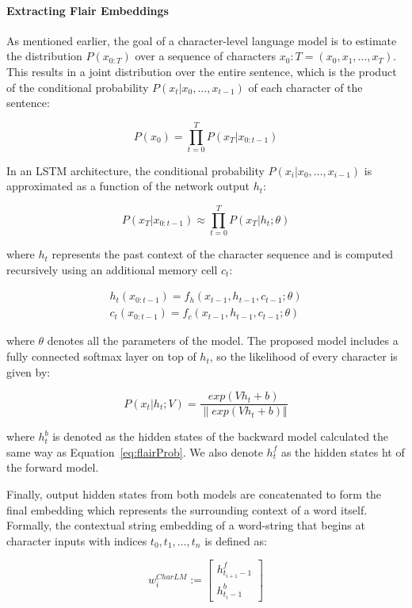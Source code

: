 \paragraph{Extracting Flair Embeddings}
\label{cap3:infExtr/sequenceLabeling/contextualEmbeddings/flairEmbeddings}
As mentioned earlier, the goal of a character-level language model is to estimate the 
distribution $P(x_{0:T})$ over a sequence of characters $x_0:T =(x_0, x_1,\ldots, x_T)$. This 
results in a joint distribution over the entire sentence, which is the product of the 
conditional probability $P(x_t|x_0,..., x_{t-1})$ of each character of the sentence:

\begin{equation} \label{eq:flairProb}
    P(x_0) = \prod_{t=0}^{T} P(x_T|x_{0:t-1})
\end{equation}

In an LSTM architecture, the conditional probability $P(x_i|x_0,\ldots,x_{i-1})$ is approximated 
as a function of the network output $h_t$:

\[
    P(x_T|x_{0:t-1}) \approx \prod_{t=0}^{T} P(x_T|h_t;\theta)    
\]

where $h_t$ represents the past context of the character sequence and is computed recursively 
using an additional memory cell $c_t$:

\begin{align*}
    h_t(x_{0:t-1})=f_h(x_{t-1},h_{t-1},c_{t-1};\theta) \\
    c_t(x_{0:t-1})=f_c(x_{t-1},h_{t-1},c_{t-1};\theta)    
\end{align*}

where $\theta$ denotes all the parameters of the model. The proposed model includes a fully 
connected softmax layer on top of $h_t$, so the likelihood of every character is given by:

\[
    P(x_t|h_t;V) = \frac{exp(V h_t+b)}{\| exp(V h_t+b) \Vert }
\]

where $h_t^b$ is denoted as the hidden states of the backward model calculated the same way as 
Equation~\ref{eq:flairProb}. We also denote $h_t^f$ as the hidden states ht of the forward model. 

Finally, output hidden states from both models are concatenated to form the final embedding 
which represents the surrounding context of a word itself. Formally, the contextual string 
embedding of a word-string that begins at character inputs with indices $t_0,t_1,\ldots,t_n$ 
is defined as:

\[
    w_i^{CharLM} := \begin{bmatrix} h_{t_{i+1}-1}^f \\ h_{t_{i}-1}^b \end{bmatrix}
\]

